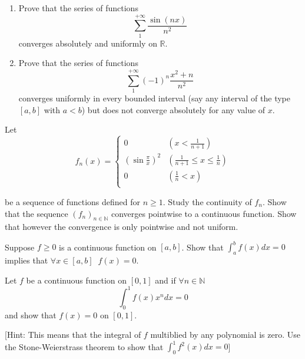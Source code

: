 \documentclass[11pt]{article}%
\begin{document}
\bigskip

\begin{Exercise}[title={**$\dagger$}]
\begin{enumerate}
	\item Prove that the series of functions $$\sum_1^{+\infty}\frac{\sin(nx)}{n^2}$$ converges absolutely and uniformly on $\mathbb{R}$.
	\item Prove that the series of functions $$\sum_1^{+\infty}(-1)^n\frac{x^2+n}{n^2}$$ converges uniformly in every bounded interval (say any interval of the type $[a,b]$ with $a<b$) but does not converge absolutely for any value of $x$.
\end{enumerate}
\end{Exercise}

\bigskip

\begin{Exercise}[title={**}]
Let
$$f_n(x)=
\begin{cases}
	0&(x<\frac{1}{n+1})\\
	(\sin\frac{\pi}{x})^2&(\frac{1}{n+1}\leq x \leq \frac{1}{n})\\
	0&(\frac{1}{n}<x)\\
\end{cases}$$

be a sequence of functions defined for $n\geq 1$. Study the continuity of $f_n$. Show that the sequence $(f_n)_{n\in\mathbb{N}}$ converges pointwise to a continuous function. Show that however the convergence is only pointwise and not uniform.
\end{Exercise}

\bigskip
\bigskip

\begin{Exercise}[title={*}]
Suppose $f\geq0$ is a continuous function on $[a,b]$. Show that $\int_a^b f(x)dx=0$ implies that $\forall x\in[a,b]\;\;f(x)=0$.

\end{Exercise}


\bigskip

\begin{Exercise}[title={**}]
Let $f$ be a continuous function on $[0,1]$ and if $\forall n\in \mathbb{N}$
$$\int_0^1 f(x) x^n dx =0$$
and show that $f(x)=0$ on $[0,1]$.

\bigskip

[Hint: This means that the integral of $f$ multiblied by any polynomial is zero. Use the Stone-Weierstrass theorem to show that $\int_0^1 f^2(x)dx=0$]
\end{Exercise}
\end{document}
